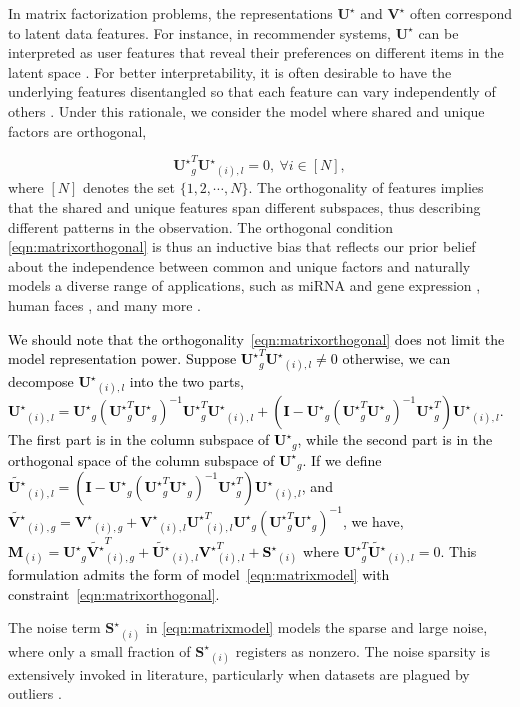 \documentclass[twoside,11pt]{article}
\newcommand{\revise}[1]{\textcolor{black}{ #1}}
\newcommand{\matI}{\mathbf{I}}
\newcommand{\matM}{\mathbf{M}}
\newcommand{\matSst}{{\mathbf{S}^\star}}
\newcommand{\matUst}{{\mathbf{U}^\star}}
\newcommand{\matVst}{{\mathbf{V}^\star}}
\begin{document}
In matrix factorization problems, the representations $\matUst$ and $\matVst$ often correspond to latent data features. For instance, in recommender systems, $\matUst$ can be interpreted as user features that reveal their preferences on different items in the latent space \citep{mfrecommender}. For better interpretability, it is often desirable to have the underlying features disentangled so that each feature can vary independently of others \citep{betavae}. Under this rationale, we consider the model where shared and unique factors are orthogonal,

\begin{equation}
\label{eqn:matrixorthogonal}
     \matUst_g^T\matUst_{(i),l}=0, \ \forall i\in[N],
\end{equation} 
where $[N]$ denotes the set $\{1,2,\cdots, N\}$. The orthogonality of features implies that the shared and unique features span different subspaces, thus describing different patterns in the observation. The orthogonal condition \eqref{eqn:matrixorthogonal} is thus an inductive bias that reflects our prior belief about the independence between common and unique factors and naturally models a diverse range of applications, such as miRNA and gene expression \citep{jive}, human faces \citep{cobe}, and many more \citep{rjive,personalizedpca}. 

\revise{We should note that the orthogonality~\eqref{eqn:matrixorthogonal} does not limit the model representation power. Suppose $\matUst_g^T\matUst_{(i),l}\neq 0$ otherwise, we can decompose $\matUst_{(i),l}$ into the two parts, $
    \matUst_{(i),l} = \matUst_g\left(\matUst_g^T\matUst_g\right)^{-1}\matUst_g^T\matUst_{(i),l} + \left(\matI-\matUst_g\left(\matUst_g^T\matUst_g\right)^{-1}\matUst_g^T\right)\matUst_{(i),l}$.
The first part is in the column subspace of $\matUst_g$, while the second part is in the orthogonal space of the column subspace of $\matUst_g$. If we define $\widetilde{\matUst}_{(i),l} = \left(\matI-\matUst_g\left(\matUst_g^T\matUst_g\right)^{-1}\matUst_g^T\right)\matUst_{(i),l}$, and $\widetilde{\matVst}_{(i),g} =\matVst_{(i),g}+ \matVst_{(i),l}\matUst_{(i),l}^T\matUst_g\left(\matUst_g^T\matUst_g\right)^{-1}$, we have, $
   \matM_{(i)} = \matUst_g\widetilde{\matVst}_{(i),g}^T+\widetilde{\matUst}_{(i),l}\matVst_{(i),l}^T + \matSst_{(i)}$
where $\matUst_g^T\widetilde{\matUst}_{(i),l}=0$. This formulation admits the form of model~\eqref{eqn:matrixmodel} with constraint~\eqref{eqn:matrixorthogonal}.} 

The noise term $\matSst_{(i)}$ in \eqref{eqn:matrixmodel} models the sparse and large noise, where only a small fraction of $\matSst_{(i)}$ registers as nonzero. The noise sparsity is extensively invoked in literature, particularly when datasets are plagued by outliers \citep{robustpca,nonconvexrobustpca,rpcaoutlier,chenfan}.
\end{document}

